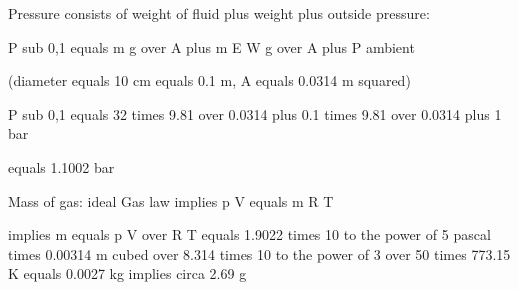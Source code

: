 Pressure consists of weight of fluid plus weight plus outside pressure:

P sub 0,1 equals m g over A plus m E W g over A plus P ambient

(diameter equals 10 cm equals 0.1 m, A equals 0.0314 m squared)

P sub 0,1 equals 32 times 9.81 over 0.0314 plus 0.1 times 9.81 over 0.0314 plus 1 bar

equals 1.1002 bar

Mass of gas: ideal Gas law implies p V equals m R T

implies m equals p V over R T equals 1.9022 times 10 to the power of 5 pascal times 0.00314 m cubed over 8.314 times 10 to the power of 3 over 50 times 773.15 K equals 0.0027 kg implies circa 2.69 g
